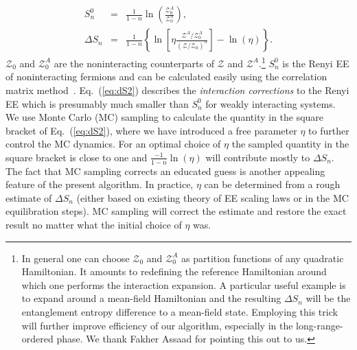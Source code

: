 \documentclass[12pt,onecolumn,english,prl,showpacs,nofootinbib]{revtex4-1}
\begin{document}
\begin{eqnarray}
S_{n}^{0}  & =& \frac{1}{1-n} \ln\left(\frac{\mathcal{Z}_{0}^{A}}{\mathcal{Z}_{0}^{n}}\right), \\ 
\Delta S_{n} & = & \frac{1}{1-n} \left\{ \ln\left[\eta \frac{\mathcal{Z}^{A}/\mathcal{Z}_{0}^{A}}{ (\mathcal{Z}/ \mathcal{Z}_{0}  )^{n}}\right] - \ln(\eta) \right\}.    
\label{eq:dS2}
\end{eqnarray}
$\mathcal{Z}_{0}$ and $\mathcal{Z}_{0}^{A}$ are the noninteracting counterparts of $\mathcal{Z}$ and $\mathcal{Z}^{A}$.\footnote{In general one can choose $\mathcal{Z}_{0}$ and $\mathcal{Z}^{A}_{0}$ as partition functions of any quadratic Hamiltonian. It amounts to redefining the reference Hamiltonian around which one performs the interaction expansion. A particular useful example is to expand around a mean-field Hamiltonian and the resulting $\Delta S_{n}$ will be the entanglement entropy difference to a mean-field state. Employing this trick will further improve efficiency of our algorithm, especially in the long-range-ordered phase. We thank Fakher Assaad for pointing this out to us.} $S_{n}^{0} $ is the Renyi EE of noninteracting fermions and can be calculated easily using the correlation matrix method~\cite{Peschel:2002gz, SM}. Eq.~(\ref{eq:dS2}) describes the \emph{interaction corrections} to the Renyi EE which is presumably much smaller than $S_{n}^{0}$ for weakly interacting systems. We use Monte Carlo (MC) sampling to calculate the quantity in the square bracket of Eq.~(\ref{eq:dS2}), where we have introduced a free parameter $\eta$ to further control the MC dynamics. For an optimal choice of $\eta$ the sampled quantity in the square bracket is close to one and  $\frac{-1}{1-n}\ln(\eta)$ will contribute mostly to $\Delta S_{n}$. The fact that MC sampling corrects an educated guess is another appealing feature of the present algorithm. In practice, $\eta$ can be determined from a rough estimate of $\Delta S_{n}$ (either based on existing theory of EE scaling laws or in the MC equilibration steps). MC sampling will correct the estimate and restore the exact result no matter what the initial choice of $\eta$ was. 
\end{document}
